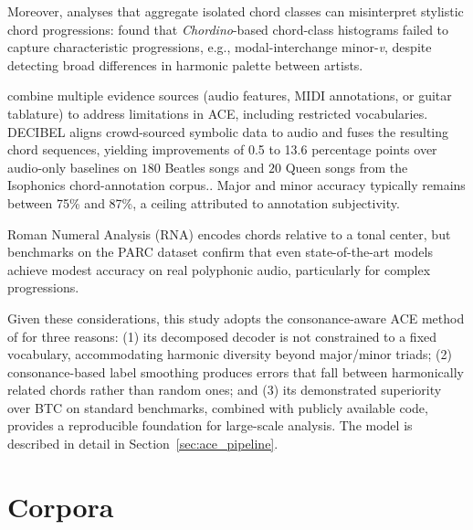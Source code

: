 \documentclass{article}
\begin{document}
Moreover, analyses that aggregate isolated chord classes can misinterpret stylistic chord progressions: \citet{collins2025recording} found that \textit{Chordino}-based chord-class histograms failed to capture characteristic progressions, e.g., modal-interchange minor-\textit{v}, despite detecting broad differences in harmonic palette between artists.


\citet{odekerken2020decibel} combine multiple evidence sources (audio features, MIDI annotations, or guitar tablature) to address limitations in ACE, including restricted vocabularies. DECIBEL aligns crowd-sourced symbolic data to audio and fuses the resulting chord sequences, yielding improvements of 0.5 to 13.6 percentage points over audio-only baselines on $180$ Beatles songs and $20$ Queen songs from the Isophonics chord-annotation corpus.. Major and minor accuracy typically remains between 75\% and 87\%, a ceiling attributed to annotation subjectivity.

Roman Numeral Analysis (RNA) encodes chords relative to a tonal center, but benchmarks on the PARC dataset \citep{poppe2025polyphonic} confirm that even state-of-the-art models achieve modest accuracy on real polyphonic audio, particularly for complex progressions.

Given these considerations, this study adopts the consonance-aware ACE method of \citet{poltronieri2025discord} for three reasons: (1) its decomposed decoder is not constrained to a fixed vocabulary, accommodating harmonic diversity beyond major/minor triads; (2) consonance-based label smoothing produces errors that fall between harmonically related chords rather than random ones; and (3) its demonstrated superiority over BTC on standard benchmarks, combined with publicly available code, provides a reproducible foundation for large-scale analysis. The model is described in detail in Section~\ref{sec:ace_pipeline}. 

\section{Corpora}
\label{sec:corpora}
\end{document}
